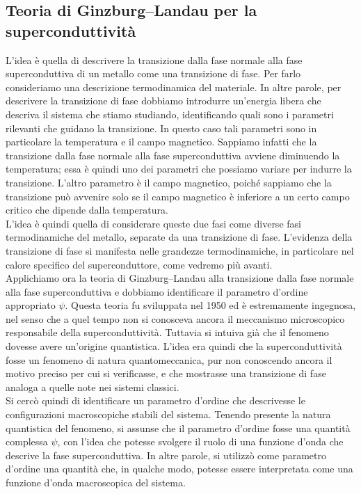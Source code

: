\subsection{Teoria di Ginzburg--Landau per la superconduttività}
L'idea è quella di descrivere la transizione dalla fase normale alla fase superconduttiva di un metallo come una transizione di fase. Per farlo consideriamo una descrizione termodinamica del materiale. In altre parole, per descrivere la transizione di fase dobbiamo introdurre un'energia libera che descriva il sistema che stiamo studiando, identificando quali sono i parametri rilevanti che guidano la transizione. In questo caso tali parametri sono in particolare la temperatura e il campo magnetico. Sappiamo infatti che la transizione dalla fase normale alla fase superconduttiva avviene diminuendo la temperatura; essa è quindi uno dei parametri che possiamo variare per indurre la transizione. L'altro parametro è il campo magnetico, poiché sappiamo che la transizione può avvenire solo se il campo magnetico è inferiore a un certo campo critico che dipende dalla temperatura.\\
L'idea è quindi quella di considerare queste due fasi come diverse fasi termodinamiche del metallo, separate da una transizione di fase. L'evidenza della transizione di fase si manifesta nelle grandezze termodinamiche, in particolare nel calore specifico del superconduttore, come vedremo più avanti.\\
Applichiamo ora la teoria di Ginzburg--Landau alla transizione dalla fase normale alla fase superconduttiva e dobbiamo identificare il parametro d'ordine appropriato $\psi$. Questa teoria fu sviluppata nel 1950 ed è estremamente ingegnosa, nel senso che a quel tempo non si conosceva ancora il meccanismo microscopico responsabile della superconduttività. Tuttavia si intuiva già che il fenomeno dovesse avere un'origine quantistica. L'idea era quindi che la superconduttività fosse un fenomeno di natura quantomeccanica, pur non conoscendo ancora il motivo preciso per cui si verificasse, e che mostrasse una transizione di fase analoga a quelle note nei sistemi classici.\\
Si cercò quindi di identificare un parametro d'ordine che descrivesse le configurazioni macroscopiche stabili del sistema. Tenendo presente la natura quantistica del fenomeno, si assunse che il parametro d'ordine fosse una quantità complessa $\psi$, con l'idea che potesse svolgere il ruolo di una funzione d'onda che descrive la fase superconduttiva. In altre parole, si utilizzò come parametro d'ordine una quantità che, in qualche modo, potesse essere interpretata come una funzione d'onda macroscopica del sistema.\\
